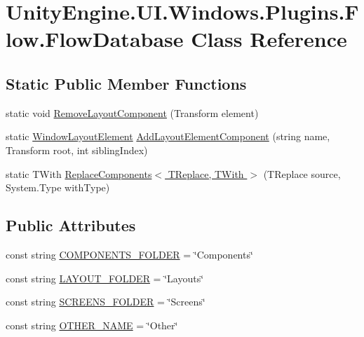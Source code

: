 \hypertarget{class_unity_engine_1_1_u_i_1_1_windows_1_1_plugins_1_1_flow_1_1_flow_database}{}\section{Unity\+Engine.\+U\+I.\+Windows.\+Plugins.\+Flow.\+Flow\+Database Class Reference}
\label{class_unity_engine_1_1_u_i_1_1_windows_1_1_plugins_1_1_flow_1_1_flow_database}
\subsection*{Static Public Member Functions}
\begin{DoxyCompactItemize}
\item 
static void \hyperlink{class_unity_engine_1_1_u_i_1_1_windows_1_1_plugins_1_1_flow_1_1_flow_database_a32525fb38174c2194322333b36147a30}{Remove\+Layout\+Component} (Transform element)
\item 
static \hyperlink{class_unity_engine_1_1_u_i_1_1_windows_1_1_window_layout_element}{Window\+Layout\+Element} \hyperlink{class_unity_engine_1_1_u_i_1_1_windows_1_1_plugins_1_1_flow_1_1_flow_database_abc85162ba155008017f9e2b404a7539d}{Add\+Layout\+Element\+Component} (string name, Transform root, int sibling\+Index)
\item 
static T\+With \hyperlink{class_unity_engine_1_1_u_i_1_1_windows_1_1_plugins_1_1_flow_1_1_flow_database_ab7b921f732e343e0431633d3a4e719b5}{Replace\+Components$<$ T\+Replace, T\+With $>$} (T\+Replace source, System.\+Type with\+Type)
\end{DoxyCompactItemize}
\subsection*{Public Attributes}
\begin{DoxyCompactItemize}
\item 
const string \hyperlink{class_unity_engine_1_1_u_i_1_1_windows_1_1_plugins_1_1_flow_1_1_flow_database_af805fc3297f1c8ed35a2925169b025bd}{C\+O\+M\+P\+O\+N\+E\+N\+T\+S\+\_\+\+F\+O\+L\+D\+E\+R} = \char`\"{}Components\char`\"{}
\item 
const string \hyperlink{class_unity_engine_1_1_u_i_1_1_windows_1_1_plugins_1_1_flow_1_1_flow_database_a32c90987f182829099d24a9f4fcf4324}{L\+A\+Y\+O\+U\+T\+\_\+\+F\+O\+L\+D\+E\+R} = \char`\"{}Layouts\char`\"{}
\item 
const string \hyperlink{class_unity_engine_1_1_u_i_1_1_windows_1_1_plugins_1_1_flow_1_1_flow_database_a9ce5685038e2ec045c1f1c879e8dff72}{S\+C\+R\+E\+E\+N\+S\+\_\+\+F\+O\+L\+D\+E\+R} = \char`\"{}Screens\char`\"{}
\item 
const string \hyperlink{class_unity_engine_1_1_u_i_1_1_windows_1_1_plugins_1_1_flow_1_1_flow_database_ae3717a28b5be41c9cca3422423a3fbe7}{O\+T\+H\+E\+R\+\_\+\+N\+A\+M\+E} = \char`\"{}Other\char`\"{}
\end{DoxyCompactItemize}


